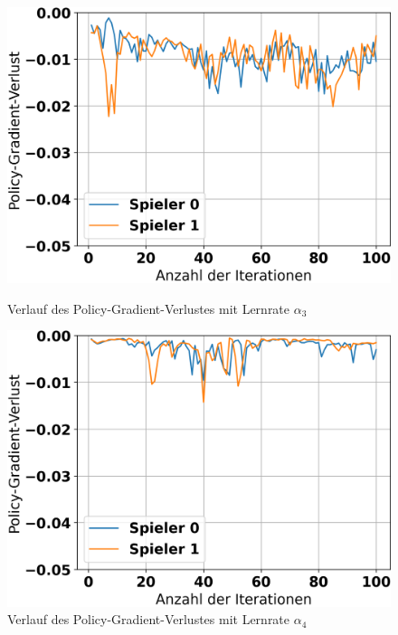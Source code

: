 \begin{figure}[H]
	\begin{minipage}[c]{0.32\linewidth}
		\includegraphics[width=\linewidth]{Bilder/ensemble-training/d_0_00003/graph_policy_gradient_losses.png}
		\caption{Verlauf des Policy-Gradient-Verlustes mit Lernrate $\alpha_3$}
	\end{minipage}
	\hfill
	\begin{minipage}[c]{0.32\linewidth}
		\includegraphics[width=\linewidth]{Bilder/ensemble-training/e_0_00001/graph_policy_gradient_losses.png}
		\caption{Verlauf des Policy-Gradient-Verlustes mit Lernrate $\alpha_4$}
	\end{minipage}
	\hfill
	\begin{minipage}[c]{0.32\linewidth}
		\makebox[\linewidth][r]{}
	\end{minipage}
\end{figure}


